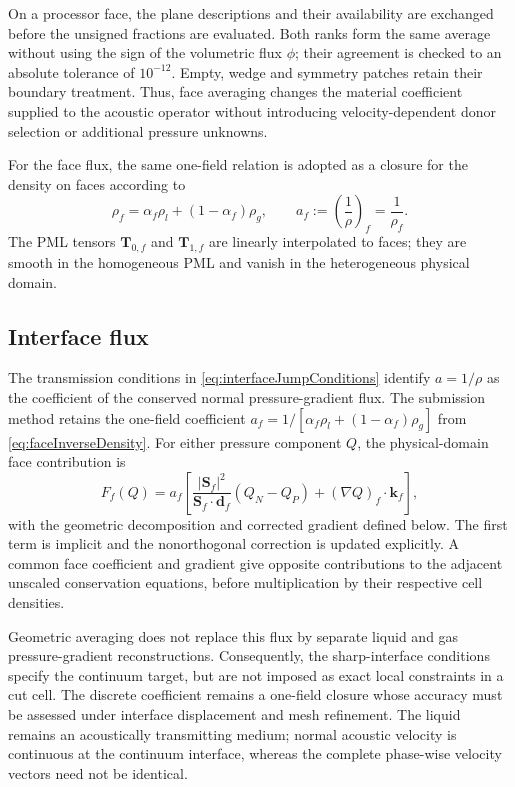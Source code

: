 \documentclass[final,12pt,nopreprintline,longtitle]{elsarticle}
\newcommand{\Sf}{\mathbf{S}_f}
\begin{document}
On a processor face, the plane descriptions and their availability are
exchanged before the unsigned fractions are evaluated.  Both ranks form the
same average without using the sign of the volumetric flux $\phi$; their
agreement is checked to an absolute tolerance of $10^{-12}$.  Empty, wedge
and symmetry patches retain their boundary treatment.  Thus, face averaging
changes the material coefficient supplied to the acoustic operator without
introducing velocity-dependent donor selection or additional pressure
unknowns.

For the face flux, the same one-field relation is adopted as a closure for
the density on faces according to
\begin{equation}
    \rho_f=\alpha_f\rho_l+(1-\alpha_f)\rho_g,
    \qquad
    a_f:=\left(\frac{1}{\rho}\right)_f=\frac{1}{\rho_f}.
    \label{eq:faceInverseDensity}
\end{equation}
The PML tensors $\mathbf{T}_{0,f}$ and
$\mathbf{T}_{1,f}$ are linearly interpolated to faces; they are smooth in the
homogeneous PML and vanish in the heterogeneous physical domain.

\subsection{Interface flux}

The transmission conditions in \cref{eq:interfaceJumpConditions} identify
$a=1/\rho$ as the coefficient of the conserved normal pressure-gradient flux.
The submission method retains the one-field coefficient
$a_f=1/[\alpha_f\rho_l+(1-\alpha_f)\rho_g]$ from
\cref{eq:faceInverseDensity}.  For either pressure component $Q$, the
physical-domain face contribution is
\begin{equation}
    F_f(Q)=a_f\left[
        \frac{|\Sf|^2}{\Sf\cdot\mathbf d_f}(Q_N-Q_P)
        +(\nabla Q)_f\cdot\mathbf k_f
    \right],
    \label{eq:retainedInterfaceFlux}
\end{equation}
with the geometric decomposition and corrected gradient defined below.
The first term is implicit and the nonorthogonal correction is updated
explicitly.  A common face coefficient and gradient give opposite
contributions to the adjacent unscaled conservation equations, before
multiplication by their respective cell densities.

Geometric averaging does not replace this flux by separate liquid and gas
pressure-gradient reconstructions.  Consequently, the sharp-interface
conditions specify the continuum target, but are not imposed as exact local
constraints in a cut cell.  The discrete coefficient remains a one-field
closure whose accuracy must be assessed under interface displacement and
mesh refinement.  The liquid remains an acoustically transmitting medium;
normal acoustic velocity is continuous at the continuum interface, whereas
the complete phase-wise velocity vectors need not be identical.
\end{document}
